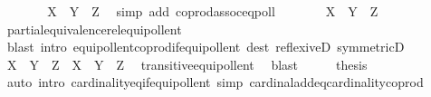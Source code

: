 \begin{isabellebody}
\ \ \isamarkupfalse%
\ \isamarkupfalse%
\ {\isachardoublequoteopen}{\isachardot}{\kern0pt}{\isachardot}{\kern0pt}{\isachardot}{\kern0pt}\ {\isasymapprox}\ X\ {\isasymCoprod}\ {\isacharparenleft}{\kern0pt}Y\ {\isasymCoprod}\ Z{\isacharparenright}{\kern0pt}{\isachardoublequoteclose}\ \isamarkupfalse%
\ {\isacharparenleft}{\kern0pt}simp\ add{\isacharcolon}{\kern0pt}\ coprod{\isacharunderscore}{\kern0pt}assoc{\isacharunderscore}{\kern0pt}eqpoll{\isacharparenright}{\kern0pt}\isanewline
\ \ \isamarkupfalse%
\ \isamarkupfalse%
\ {\isachardoublequoteopen}{\isachardot}{\kern0pt}{\isachardot}{\kern0pt}{\isachardot}{\kern0pt}\ {\isasymapprox}\ X\ {\isasymCoprod}\ {\isacharbar}{\kern0pt}Y\ {\isasymCoprod}\ Z{\isacharbar}{\kern0pt}{\isachardoublequoteclose}\isanewline
\ \ \ \ \isamarkupfalse%
\ partial{\isacharunderscore}{\kern0pt}equivalence{\isacharunderscore}{\kern0pt}rel{\isacharunderscore}{\kern0pt}equipollent\isanewline
\ \ \ \ \isamarkupfalse%
\ {\isacharparenleft}{\kern0pt}blast\ intro{\isacharcolon}{\kern0pt}\ equipollent{\isacharunderscore}{\kern0pt}coprod{\isacharunderscore}{\kern0pt}if{\isacharunderscore}{\kern0pt}equipollent\ dest{\isacharcolon}{\kern0pt}\ reflexiveD\ symmetricD{\isacharparenright}{\kern0pt}\isanewline
\ \ \isamarkupfalse%
\ \isamarkupfalse%
\ {\isachardoublequoteopen}{\isacharbar}{\kern0pt}{\isacharparenleft}{\kern0pt}X\ {\isasymCoprod}\ Y{\isacharparenright}{\kern0pt}{\isacharbar}{\kern0pt}\ {\isasymCoprod}\ Z\ {\isasymapprox}\ X\ {\isasymCoprod}\ {\isacharbar}{\kern0pt}Y\ {\isasymCoprod}\ Z{\isacharbar}{\kern0pt}{\isachardoublequoteclose}\ \isamarkupfalse%
\ transitive{\isacharunderscore}{\kern0pt}equipollent\ \isamarkupfalse%
\ blast\isanewline
\ \ \isamarkupfalse%
\ \isamarkupfalse%
\ {\isacharquery}{\kern0pt}thesis\isanewline
\ \ \ \ \isamarkupfalse%
\ {\isacharparenleft}{\kern0pt}auto\ intro{\isacharcolon}{\kern0pt}\ cardinality{\isacharunderscore}{\kern0pt}eq{\isacharunderscore}{\kern0pt}if{\isacharunderscore}{\kern0pt}equipollent\ simp{\isacharcolon}{\kern0pt}\ cardinal{\isacharunderscore}{\kern0pt}add{\isacharunderscore}{\kern0pt}eq{\isacharunderscore}{\kern0pt}cardinality{\isacharunderscore}{\kern0pt}coprod{\isacharparenright}{\kern0pt}\isanewline
{}\isamarkupfalse%
%
\endisatagproof
{\isafoldproof}%
%
\isadelimproof
\isanewline
%
\endisadelimproof
\isanewline
{}\isamarkupfalse%

\end{isabellebody}
